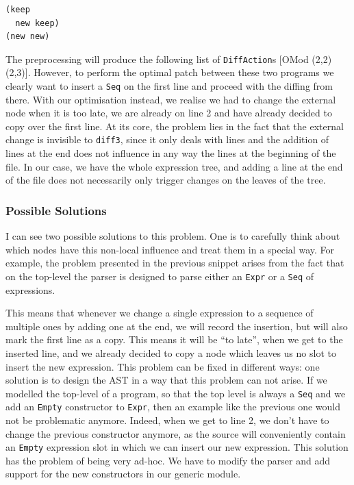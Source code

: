 \documentclass[11pt]{article}
\begin{document}
\begin{lstlisting}[language=haskell]
(keep
  new keep)
(new new)
\end{lstlisting}

The preprocessing will produce the following list of \texttt{DiffAction}s [OMod (2,2) 
(2,3)]. However, to perform the optimal patch between these two programs we 
clearly want to insert a \texttt{Seq} on the first line and proceed with the 
diffing from there. With our optimisation instead, we realise we had to change 
the external node when it is too late, we are already on line 2 and have already 
decided to copy over the first line. 
At its core, the problem lies in the fact that the external change is invisible to 
\texttt{diff3}, since it only deals with lines and the addition of lines at the end does not influence in any way
the lines at the beginning of the file. In our case, we have the whole 
expression tree, and adding a line at the end of the file does not necessarily only trigger 
changes on the leaves of the tree.

\subsubsection{Possible Solutions}
I can see two possible solutions to this problem. One is to carefully think 
about which nodes have this non-local influence and treat them in a special way. 
For example, the problem presented in the previous snippet arises from the fact 
that on the top-level the parser is designed to parse either an \texttt{Expr} or 
a \texttt{Seq} of expressions. 

This means that whenever we change a single expression to a sequence of 
multiple ones by adding one at the end, we will record the insertion, but will 
also mark the first line as a copy. This means it will be ``to late'', when we 
get to the inserted line, and we already decided to copy a node which leaves us 
no slot to insert the new expression.
This problem can be fixed in different ways: one solution is to design the AST in a 
way that this problem can not arise. If we modelled the top-level of a program, 
so that the top level is always a \texttt{Seq} and we add an \texttt{Empty} 
constructor to \texttt{Expr}, then an example like the previous one would not be 
problematic anymore. Indeed, when we get to line 2, we don't have to change the 
previous constructor anymore, as the source will conveniently contain an 
\texttt{Empty} expression slot in which we can insert our new expression.
This solution has the problem of being very ad-hoc. We have to modify the parser 
and add support for the new constructors in our generic module. 
\end{document}
